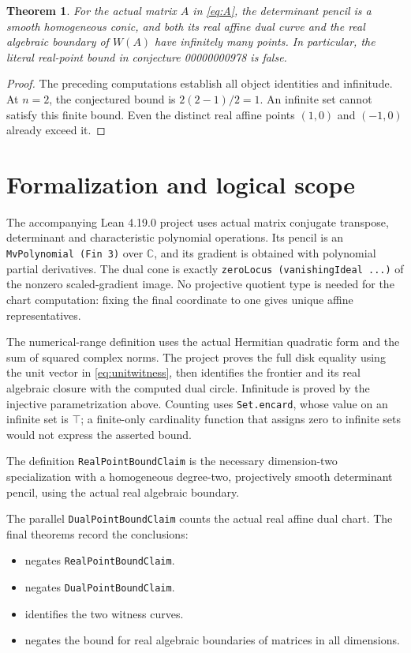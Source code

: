 \documentclass[10pt,letterpaper]{article}
\newcommand{\C}{\mathbb{C}}
\newtheorem{theorem}{Theorem}
\begin{document}
\begin{theorem}
For the actual matrix $A$ in \eqref{eq:A}, the determinant pencil is a smooth homogeneous conic, and both its real affine dual curve and the real algebraic boundary of $W(A)$ have infinitely many points. In particular, the literal real-point bound in conjecture 00000000978 is false.
\end{theorem}
\begin{proof}
The preceding computations establish all object identities and infinitude. At $n=2$, the conjectured bound is $2(2-1)/2=1$. An infinite set cannot satisfy this finite bound. Even the distinct real affine points $(1,0)$ and $(-1,0)$ already exceed it.
\end{proof}

\section{Formalization and logical scope}
The accompanying Lean 4.19.0 project uses actual matrix conjugate transpose, determinant and characteristic polynomial operations. Its pencil is an \texttt{MvPolynomial (Fin 3)} over $\C$, and its gradient is obtained with polynomial partial derivatives. The dual cone is exactly \texttt{zeroLocus (vanishingIdeal ...)} of the nonzero scaled-gradient image. No projective quotient type is needed for the chart computation: fixing the final coordinate to one gives unique affine representatives.

The numerical-range definition uses the actual Hermitian quadratic form and the sum of squared complex norms. The project proves the full disk equality using the unit vector in \eqref{eq:unitwitness}, then identifies the frontier and its real algebraic closure with the computed dual circle. Infinitude is proved by the injective parametrization above. Counting uses \texttt{Set.encard}, whose value on an infinite set is $\top$; a finite-only cardinality function that assigns zero to infinite sets would not express the asserted bound.

The definition \texttt{RealPointBoundClaim} is the necessary dimension-two specialization with a homogeneous degree-two, projectively smooth determinant pencil, using the actual real algebraic boundary.

The parallel \texttt{DualPointBoundClaim} counts the actual real affine dual chart. The final theorems record the conclusions:
\begin{itemize}
\item {} negates \texttt{RealPointBoundClaim}.
\item {} negates \texttt{DualPointBoundClaim}.
\item {} identifies the two witness curves.
\item {} negates the bound for real algebraic boundaries of matrices in all dimensions.
\end{itemize}
\end{document}

